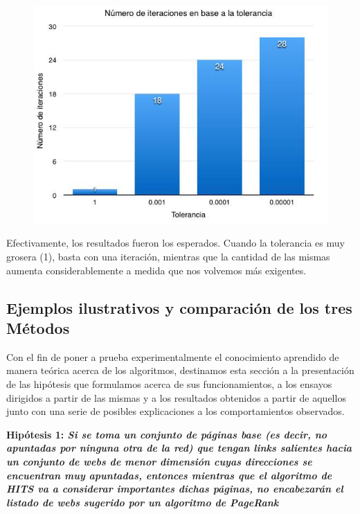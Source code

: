 \documentclass[a4paper]{article}
\begin{document}
\begin{figure}[h!]
  \begin{center}
	\includegraphics[scale=0.50]{imagenes/001.jpg}
	\label{nombreparareferenciar}
  \end{center}
\end{figure}

Efectivamente, los resultados fueron los esperados. Cuando la tolerancia es muy grosera (1), basta con una iteración, mientras que la cantidad de las mismas aumenta considerablemente a medida que nos volvemos más exigentes.
\newpage
\subsection{Ejemplos ilustrativos y comparaci\'on de los tres M\'etodos}


Con el fin de poner a prueba experimentalmente el conocimiento aprendido de manera teórica acerca de los algoritmos, destinamos esta sección a la presentación de las hipótesis que formulamos acerca de sus funcionamientos, a los ensayos dirigidos a partir de las mismas y a los resultados obtenidos a partir de aquellos junto con una serie de posibles explicaciones a los comportamientos observados.

\textbf{Hipótesis 1: \itshape{Si se toma un conjunto de páginas base (es decir, no apuntadas por ninguna otra de la red) que tengan links salientes hacia un conjunto de webs de menor dimensión cuyas direcciones se encuentran muy apuntadas, entonces mientras que el algoritmo de HITS va a considerar importantes dichas páginas, no encabezarán el listado de webs sugerido por un algoritmo de PageRank}}\\
\end{document}
